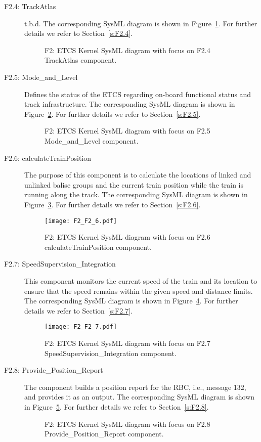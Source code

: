 \begin{description}
\item[F2.4: TrackAtlas] t.b.d.  The corresponding SysML diagram is shown in Figure~\ref{f:f2.4_overview}. For further details we refer to Section~\ref{s:F2.4}.
\begin{figure}
\center
{}
\caption{F2: ETCS Kernel SysML diagram with focus on F2.4 TrackAtlas component.}\label{f:f2.4_overview}
\end{figure}

\item[F2.5: Mode\_and\_Level] Defines the status of the ETCS regarding on-board functional status and track infrastructure. The corresponding SysML diagram is shown in Figure~\ref{f:f2.5_overview}. For further details we refer to Section~\ref{s:F2.5}.
\begin{figure}
\center
{}
\caption{F2: ETCS Kernel SysML diagram with focus on F2.5 Mode\_and\_Level component.}\label{f:f2.5_overview}
\end{figure}

\item[F2.6: calculateTrainPosition] The purpose of this component is to calculate the locations of linked and unlinked balise groups and the current train position while the train is running along the track. The corresponding SysML diagram is shown in Figure~\ref{f:f2.6_overview}. For further details we refer to Section~\ref{s:F2.6}.
\begin{figure}
\center
\texttt{[image: F2\_F2\_6.pdf]}
\caption{F2: ETCS Kernel SysML diagram with focus on F2.6 calculateTrainPosition component.}\label{f:f2.6_overview}
\end{figure}

\item[F2.7: SpeedSupervision\_Integration] This component monitors the current speed of the train and its location to ensure that the speed remains within the given speed and distance limits. The corresponding SysML diagram is shown in Figure~\ref{f:f2.7_overview}. For further details we refer to Section~\ref{s:F2.7}.
\begin{figure}
\center
\texttt{[image: F2\_F2\_7.pdf]}
\caption{F2: ETCS Kernel SysML diagram with focus on F2.7 SpeedSupervision\_Integration component.}\label{f:f2.7_overview}
\end{figure}

\item[F2.8: Provide\_Position\_Report] The component builds a position report for the RBC, i.e., message 132, and provides it as an output. The corresponding SysML diagram is shown in Figure~\ref{f:f2.8_overview}. For further details we refer to Section~\ref{s:F2.8}.
\begin{figure}
\center
{}
\caption{F2: ETCS Kernel SysML diagram with focus on F2.8 Provide\_Position\_Report component.}\label{f:f2.8_overview}
\end{figure}


\end{description}
